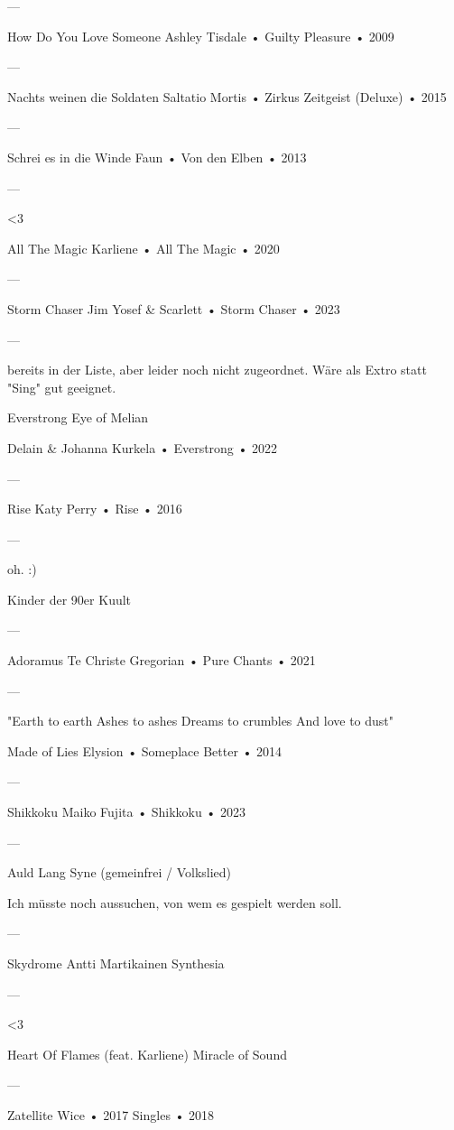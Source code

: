 —

How Do You Love Someone
Ashley Tisdale
 •
Guilty Pleasure
 •
2009

—

Nachts weinen die Soldaten
Saltatio Mortis
 •
Zirkus Zeitgeist (Deluxe)
 • 2015

—

Schrei es in die Winde
Faun
 •
Von den Elben
 • 2013

—

<3

All The Magic
Karliene
 •
All The Magic
 •
2020

—

Storm Chaser
Jim Yosef & Scarlett
 •
Storm Chaser
 •
2023

—

bereits in der Liste, aber leider noch nicht zugeordnet. Wäre als Extro statt "Sing" gut geeignet.

Everstrong
Eye of Melian

Delain
 &
Johanna Kurkela
 •
Everstrong
 •
2022


—

Rise
Katy Perry
 •
Rise
 •
2016

—

oh. :)

Kinder der 90er
Kuult


—

Adoramus Te Christe
Gregorian
 •
Pure Chants
 •
2021





—

"Earth to earth
Ashes to ashes
Dreams to crumbles
And love to dust"


Made of Lies
Elysion
 •
Someplace Better
 •
2014



---


Shikkoku
Maiko Fujita
 •
Shikkoku
 • 2023

—

Auld Lang Syne
(gemeinfrei / Volkslied)

Ich müsste noch aussuchen, von wem es gespielt werden soll.

—

Skydrome
Antti Martikainen
Synthesia

—

<3

Heart Of Flames (feat. Karliene)
Miracle of Sound


—

Zatellite
Wice
 •
2017 Singles
 •
2018

